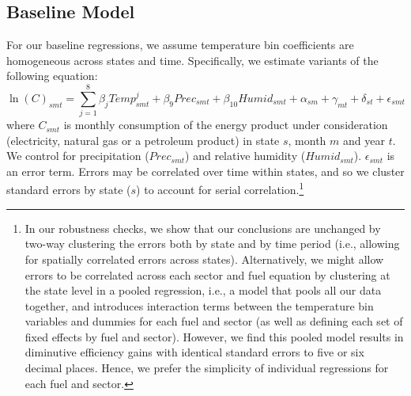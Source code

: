 \documentclass[11pt]{article}
\begin{document}
\subsection{Baseline Model}
For our baseline regressions, we assume temperature bin coefficients are homogeneous across states and time. Specifically, we estimate variants of the following equation:  
\begin{equation}
\ln(C)_{smt} = \sum_{j=1}^{8} \beta_{j} Temp_{smt}^{j} + \beta_{9} Prec_{smt} + \beta_{10} Humid_{smt} + \alpha_{sm} + \gamma_{mt} + \delta_{st} + \epsilon_{smt} \label{eq:base}%
\end{equation} 
where $C_{smt}$ is monthly consumption of the energy product under consideration (electricity, natural gas or a petroleum product) in state $s$, month $m$ and year $t$. We control for precipitation ($Prec_{smt}$) and relative humidity ($Humid_{smt}$). $\epsilon_{smt}$ is an error term. Errors may be correlated over time within states, and so we cluster standard errors by state ($s$) to account for serial correlation.\footnote{ In our robustness checks, we show that our conclusions are unchanged by two-way clustering the errors both by state and by time period (i.e., allowing for spatially correlated errors across states). Alternatively, we might allow errors to be correlated across each sector and fuel equation by clustering at the state level in a pooled regression, i.e., a model that pools all our data together, and introduces interaction terms between the temperature bin variables and dummies for each fuel and sector (as well as defining each set of fixed effects by fuel and sector). However, we find this pooled model results in diminutive efficiency gains with identical standard errors to five or six decimal places. Hence, we prefer the simplicity of individual regressions for each fuel and sector.}%
\end{document}
